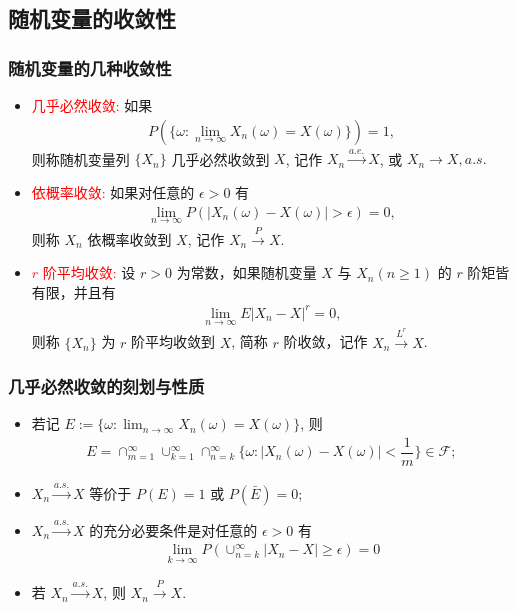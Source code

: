 \documentclass[Prob-All.tex]{subfiles}
\begin{document}
\subsection{随机变量的收敛性}
\begin{frame}
	\frametitle{随机变量的几种收敛性}
	\begin{itemize}[<+-|alert@+>]
		\item \textcolor{red}{几乎必然收敛:} 如果
		\begin{eqnarray*}
			P(\{\omega:\lim_{n\rightarrow\infty}X_n(\omega)=X(\omega)\})=1,
		\end{eqnarray*} 则称随机变量列 $\{X_n\}$ 几乎必然收敛到 $X$, 记作 $X_n\stackrel{a.e.}{\rightarrow} X$, 或 $X_n\rightarrow X, a.s.$

		\item \textcolor{red}{依概率收敛:} 如果对任意的 $\epsilon>0$ 有
		\begin{eqnarray*}
			\lim_{n\rightarrow\infty}P(|X_n(\omega)-X(\omega)|>\epsilon)=0,
		\end{eqnarray*}
		则称 $X_n$ 依概率收敛到 $X$, 记作 $X_n\stackrel{P}{\rightarrow} X$.
		\item \textcolor{red}{$r$ 阶平均收敛:} 设 $r>0$ 为常数，如果随机变量 $X$ 与 $X_n (n\geq 1)$ 的 $r$ 阶矩皆有限，并且有
		\begin{eqnarray*}
			\lim_{n\rightarrow\infty}E|X_n-X|^r=0,
		\end{eqnarray*}
		则称 $\{X_n\}$ 为 $r$ 阶平均收敛到 $X$, 简称 $r$ 阶收敛，记作 $X_n\stackrel{L^r}{\rightarrow} X$.
	\end{itemize}
\end{frame}

\begin{frame}
	\frametitle{几乎必然收敛的刻划与性质}
	\begin{itemize}[<+-|alert@+>]
		\item 若记 $E:=\{\omega: \lim_{n\rightarrow\infty} X_n (\omega)=X (\omega)\}$, 则
		\begin{eqnarray*}
			E=\cap_{m=1}^\infty\cup_{k=1}^\infty\cap_{n=k}^\infty\{\omega:|X_n(\omega)-X(\omega)|<\dfrac{1}{m}\}\in \mathcal{F};
		\end{eqnarray*}
		\item $X_n\stackrel{a.s.}{\rightarrow} X$ 等价于 $P (E)=1$ 或 $P (\bar{E})=0$;
		\item $X_n\stackrel{a.s.}{\rightarrow} X$ 的充分必要条件是对任意的 $\epsilon>0$ 有
		\begin{eqnarray*}
			\lim_{k\rightarrow\infty}P(\cup_{n=k}^\infty|X_n-X|\geq \epsilon)=0
		\end{eqnarray*}
		\item 若 $X_n\stackrel{a.s.}{\rightarrow} X$, 则 $X_n\stackrel{P}{\rightarrow} X$.

	\end{itemize}

\end{frame}
\end{document}
